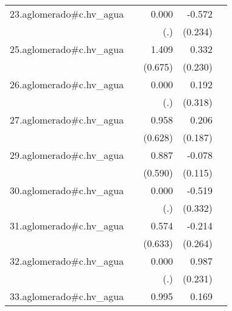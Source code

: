 {\begin{longtable}{l*{4}{D{.}{.}{-1}}}
\addlinespace
23.aglomerado#c.hv\_agua&                     &       0.000         &      -0.572\sym{*}  &                     \\
            &                     &         (.)         &     (0.234)         &                     \\
\addlinespace
25.aglomerado#c.hv\_agua&                     &       1.409\sym{*}  &       0.332         &                     \\
            &                     &     (0.675)         &     (0.230)         &                     \\
\addlinespace
26.aglomerado#c.hv\_agua&                     &       0.000         &       0.192         &                     \\
            &                     &         (.)         &     (0.318)         &                     \\
\addlinespace
27.aglomerado#c.hv\_agua&                     &       0.958         &       0.206         &                     \\
            &                     &     (0.628)         &     (0.187)         &                     \\
\addlinespace
29.aglomerado#c.hv\_agua&                     &       0.887         &      -0.078         &                     \\
            &                     &     (0.590)         &     (0.115)         &                     \\
\addlinespace
30.aglomerado#c.hv\_agua&                     &       0.000         &      -0.519         &                     \\
            &                     &         (.)         &     (0.332)         &                     \\
\addlinespace
31.aglomerado#c.hv\_agua&                     &       0.574         &      -0.214         &                     \\
            &                     &     (0.633)         &     (0.264)         &                     \\
\addlinespace
32.aglomerado#c.hv\_agua&                     &       0.000         &       0.987\sym{***}&                     \\
            &                     &         (.)         &     (0.231)         &                     \\
\addlinespace
33.aglomerado#c.hv\_agua&                     &       0.995         &       0.169\sym{**} &                     \\

\end{longtable}}
